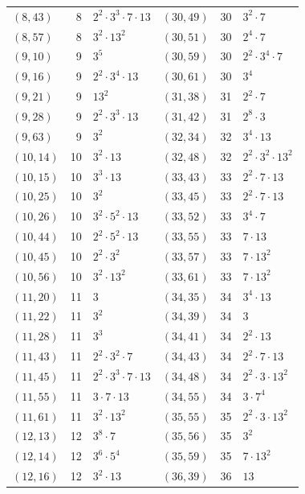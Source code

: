 \documentclass[11pt]{article}
\begin{document}
\begin{longtable}{@{}lrl@{\qquad}lrl@{}}
$(8,43)$ & 8 & $2^{2}\cdot 3^{3}\cdot 7\cdot 13$ & $(30,49)$ & 30 & $3^{2}\cdot 7$\\
$(8,57)$ & 8 & $3^{2}\cdot 13^{2}$ & $(30,51)$ & 30 & $2^{4}\cdot 7$\\
$(9,10)$ & 9 & $3^{5}$ & $(30,59)$ & 30 & $2^{2}\cdot 3^{4}\cdot 7$\\
$(9,16)$ & 9 & $2^{2}\cdot 3^{4}\cdot 13$ & $(30,61)$ & 30 & $3^{4}$\\
$(9,21)$ & 9 & $13^{2}$ & $(31,38)$ & 31 & $2^{2}\cdot 7$\\
$(9,28)$ & 9 & $2^{2}\cdot 3^{3}\cdot 13$ & $(31,42)$ & 31 & $2^{8}\cdot 3$\\
$(9,63)$ & 9 & $3^{2}$ & $(32,34)$ & 32 & $3^{4}\cdot 13$\\
$(10,14)$ & 10 & $3^{2}\cdot 13$ & $(32,48)$ & 32 & $2^{2}\cdot 3^{2}\cdot 13^{2}$\\
$(10,15)$ & 10 & $3^{3}\cdot 13$ & $(33,43)$ & 33 & $2^{2}\cdot 7\cdot 13$\\
$(10,25)$ & 10 & $3^{2}$ & $(33,45)$ & 33 & $2^{2}\cdot 7\cdot 13$\\
$(10,26)$ & 10 & $3^{2}\cdot 5^{2}\cdot 13$ & $(33,52)$ & 33 & $3^{4}\cdot 7$\\
$(10,44)$ & 10 & $2^{2}\cdot 5^{2}\cdot 13$ & $(33,55)$ & 33 & $7\cdot 13$\\
$(10,45)$ & 10 & $2^{2}\cdot 3^{2}$ & $(33,57)$ & 33 & $7\cdot 13^{2}$\\
$(10,56)$ & 10 & $3^{2}\cdot 13^{2}$ & $(33,61)$ & 33 & $7\cdot 13^{2}$\\
$(11,20)$ & 11 & $3$ & $(34,35)$ & 34 & $3^{4}\cdot 13$\\
$(11,22)$ & 11 & $3^{2}$ & $(34,39)$ & 34 & $3$\\
$(11,28)$ & 11 & $3^{3}$ & $(34,41)$ & 34 & $2^{2}\cdot 13$\\
$(11,43)$ & 11 & $2^{2}\cdot 3^{2}\cdot 7$ & $(34,43)$ & 34 & $2^{2}\cdot 7\cdot 13$\\
$(11,45)$ & 11 & $2^{2}\cdot 3^{3}\cdot 7\cdot 13$ & $(34,48)$ & 34 & $2^{2}\cdot 3\cdot 13^{2}$\\
$(11,55)$ & 11 & $3\cdot 7\cdot 13$ & $(34,55)$ & 34 & $3\cdot 7^{4}$\\
$(11,61)$ & 11 & $3^{2}\cdot 13^{2}$ & $(35,55)$ & 35 & $2^{2}\cdot 3\cdot 13^{2}$\\
$(12,13)$ & 12 & $3^{8}\cdot 7$ & $(35,56)$ & 35 & $3^{2}$\\
$(12,14)$ & 12 & $3^{6}\cdot 5^{4}$ & $(35,59)$ & 35 & $7\cdot 13^{2}$\\
$(12,16)$ & 12 & $3^{2}\cdot 13$ & $(36,39)$ & 36 & $13$\\

\end{longtable}
\end{document}
